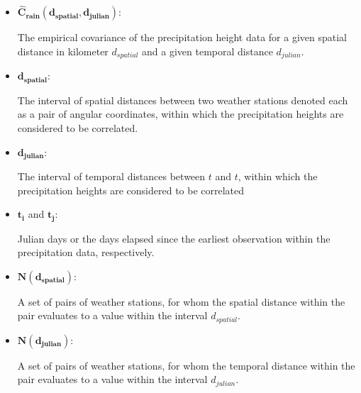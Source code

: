 \documentclass[
  12pt,
]{article}
\begin{document}
\vspace{-0.5cm}
  \begin{itemize}[label={}]
              \item $\mathbf{\widehat{C}_{rain}(d_{spatial},d_{julian})}$: \\ 
                \begin{adjustwidth}{1cm}{0cm} The empirical covariance of the precipitation height data for a given spatial distance in kilometer $d_{spatial}$ and a given temporal distance $d_{julian}$.
                \end{adjustwidth}
              \item $\mathbf{d_{spatial}}$:\\ 
                \begin{adjustwidth}{1cm}{0cm} The interval of spatial distances between two weather stations denoted each as a pair of angular coordinates, within which the precipitation heights are considered to be correlated.
                \end{adjustwidth}
              \item $\mathbf{d_{julian}}$:\\ 
                \begin{adjustwidth}{1cm}{0cm} The interval of temporal distances between $t$ and $t$, within which the precipitation heights are considered to be correlated
                \end{adjustwidth}
              \item $\mathbf{t_{i}}$ and $\mathbf{t_{j}}$:\\ 
                \begin{adjustwidth}{1cm}{0cm} Julian days or the days elapsed since the earliest observation within the precipitation data, respectively.
                \end{adjustwidth}
              \item $\mathbf{N(d_{spatial})}$:\\ 
                \begin{adjustwidth}{1cm}{0cm} A set of pairs of weather stations, for whom the spatial distance within the pair evaluates to a value within the interval $d_{spatial}$.
                \end{adjustwidth}
              \item $\mathbf{N(d_{julian})}$:\\ 
                \begin{adjustwidth}{1cm}{0cm} A set of pairs of weather stations, for whom the temporal distance within the pair evaluates to a value within the interval $d_{julian}$. 

\end{adjustwidth}
\end{itemize}
\end{document}
